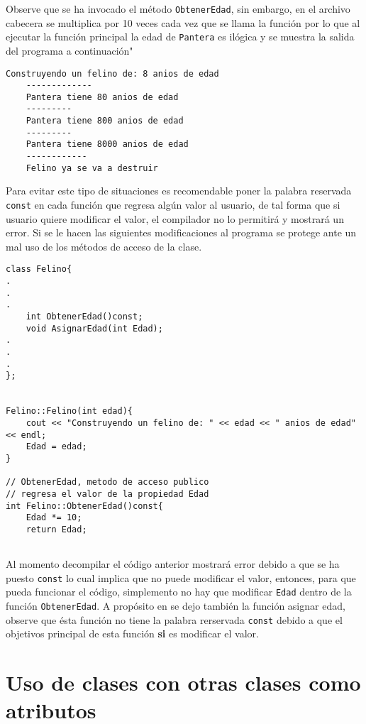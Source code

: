 \documentclass[12pt]{extarticle}
\newcommand{\<}{\langle}
\renewcommand{\>}{\rangle}
\theoremstyle{definition}
\begin{document}
Observe que se ha invocado el método \verb|ObtenerEdad|, sin embargo, en el archivo cabecera se multiplica por 10 veces cada vez que se llama la función por lo que al ejecutar la función principal la edad de \verb|Pantera| es ilógica y se muestra la salida del programa a continuación"

\begin{lstlisting}[caption={Ejecución del programa, observe que ha dado valores fuera de la lógica},captionpos=b]
	Construyendo un felino de: 8 anios de edad
	-------------
	Pantera tiene 80 anios de edad
	---------
	Pantera tiene 800 anios de edad
	---------
	Pantera tiene 8000 anios de edad
	------------
	Felino ya se va a destruir
\end{lstlisting}

Para evitar este tipo de situaciones es recomendable poner la palabra reservada \verb|const| en cada función que regresa algún valor al usuario, de tal forma que si usuario quiere modificar el valor, el compilador no lo permitirá y mostrará un error. Si se le hacen las siguientes modificaciones al programa se protege ante un mal uso de los métodos de acceso de la clase.

\begin{lstlisting}[caption={Se ha agregado la palabra const para proteger los elementos privados de la clase},captionpos=b]
class Felino{
.
.
.
	int ObtenerEdad()const;
	void AsignarEdad(int Edad);
.
.
.
};


Felino::Felino(int edad){
	cout << "Construyendo un felino de: " << edad << " anios de edad" << endl; 
	Edad = edad;
}

// ObtenerEdad, metodo de acceso publico
// regresa el valor de la propiedad Edad
int Felino::ObtenerEdad()const{
	Edad *= 10;
	return Edad;
	
\end{lstlisting}
Al momento decompilar el código anterior mostrará error debido a que se ha puesto \verb|const| lo cual implica que no puede modificar el valor, entonces, para que pueda funcionar el código, simplemento no hay que modificar \verb|Edad| dentro de la función \verb|ObtenerEdad|. A propósito en se dejo también la función asignar edad, observe que ésta función no tiene la palabra rerservada \verb|const| debido a que el objetivos principal de esta función \textbf{si} es modificar el valor.


\section{Uso de clases con otras clases como atributos}
\end{document}
